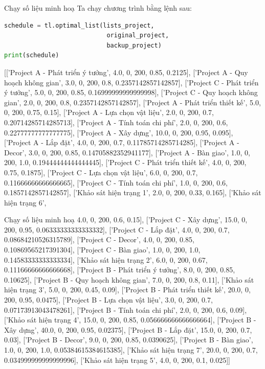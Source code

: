 \documentclass[10pt]{beamer}
\begin{document}
\begin{frame}[fragile]{Chạy số liệu minh hoạ}
Ta chạy chương trình bằng lệnh sau:
\begin{lstlisting}[language=Python]
schedule = tl.optimal_list(lists_project,
                            original_project,
                            backup_project)
print(schedule)
\end{lstlisting}

{\scriptsize [['Project A - Phát triển ý tưởng', 4.0, 0, 200, 0.85, 0.2125], ['Project A - Quy hoạch không gian', 3.0, 0, 200, 0.8, 0.2357142857142857], ['Project C - Phát triển ý tưởng', 5.0, 0, 200, 0.85, 0.16999999999999998], ['Project C - Quy hoạch không gian', 2.0, 0, 200, 0.8, 0.2357142857142857], ['Project A - Phát triển thiết kế', 5.0, 0, 200, 0.75, 0.15], ['Project A - Lựa chọn vật liệu', 2.0, 0, 200, 0.7, 0.20714285714285713], ['Project A - Tính toán chi phí', 2.0, 0, 200, 0.6, 0.22777777777777775], ['Project A - Xây dựng', 10.0, 0, 200, 0.95, 0.095], ['Project A - Lắp đặt', 4.0, 0, 200, 0.7, 0.11785714285714285], ['Project A - Decor', 3.0, 0, 200, 0.85, 0.14705882352941177], ['Project A - Bàn giao', 1.0, 0, 200, 1.0, 0.19444444444444445], ['Project C - Phát triển thiết kế', 4.0, 0, 200, 0.75, 0.1875], ['Project C - Lựa chọn vật liệu', 6.0, 0, 200, 0.7, 0.11666666666666665], ['Project C - Tính toán chi phí', 1.0, 0, 200, 0.6, 0.1857142857142857], ['Khảo sát hiện trạng 1', 2.0, 0, 200, 0.33, 0.165], ['Khảo sát hiện trạng 6',
}
    
\end{frame}

\begin{frame}{Chạy số liệu minh hoạ}
\footnotesize
4.0, 0, 200, 0.6, 0.15], ['Project C - Xây dựng', 15.0, 0, 200, 0.95, 0.06333333333333332], ['Project C - Lắp đặt', 4.0, 0, 200, 0.7, 0.08684210526315789], ['Project C - Decor', 4.0, 0, 200, 0.85, 0.10869565217391304], ['Project C - Bàn giao', 1.0, 0, 200, 1.0, 0.14583333333333334], ['Khảo sát hiện trạng 2', 6.0, 0, 200, 0.67, 0.11166666666666668], ['Project B - Phát triển ý tưởng', 8.0, 0, 200, 0.85, 0.10625], ['Project B - Quy hoạch không gian', 7.0, 0, 200, 0.8, 0.11], ['Khảo sát hiện trạng 3', 5.0, 0, 200, 0.45, 0.09], ['Project B - Phát triển thiết kế', 20.0, 0, 200, 0.95, 0.0475], ['Project B - Lựa chọn vật liệu', 3.0, 0, 200, 0.7, 0.07173913043478261], ['Project B - Tính toán chi phí', 2.0, 0, 200, 0.6, 0.09], ['Khảo sát hiện trạng 4', 15.0, 0, 200, 0.85, 0.056666666666666664], ['Project B - Xây dựng', 40.0, 0, 200, 0.95, 0.02375], ['Project B - Lắp đặt', 15.0, 0, 200, 0.7, 0.03], ['Project B - Decor', 9.0, 0, 200, 0.85, 0.0390625], ['Project B - Bàn giao', 1.0, 0, 200, 1.0, 0.05384615384615385], ['Khảo sát hiện trạng 7', 20.0, 0, 200, 0.7, 0.034999999999999996], ['Khảo sát hiện trạng 5', 4.0, 0, 200, 0.1, 0.025]]
\end{frame}


\begin{frame}
    \nocite{*}
    \printbibliography
\end{frame}


\begin{frame}
    \begin{block}{}
    \medskip
    \center{\huge \it \textcolor[rgb]{0.50,0.30,1.0}{Cảm ơn mọi người đã quan tâm theo dõi!}}
    \medskip
    \end{block}	
\end{frame}    
\end{document}

